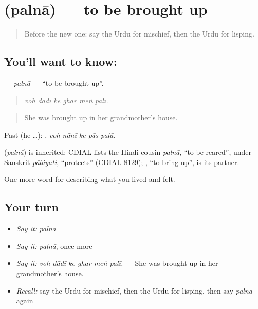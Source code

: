 \section[\texorpdfstring{\ur{پلنا} (palnā)}{پلنا (palnā)}]{ (palnā) — to be brought up}

\label{lesson:UR-C485-palna-reared}



\begin{quote}
Before the new one: say the Urdu for mischief, then the Urdu for lisping.
\end{quote}

\subsection*{You'll want to know: }
\textbf{} — \emph{palnā} — \textquotedblleft{}to be brought up\textquotedblright{}.

\begin{quote}
     
\end{quote}

\begin{quote}
\emph{voh dādī ke ghar meṅ palī.}
\end{quote}

\begin{quote}
She was brought up in her grandmother's house.
\end{quote}

Past (he …):     , \emph{voh nānī ke pās palā}.

\begin{cousinweb}
\textbf{} (\emph{palnā}) is inherited: CDIAL lists the Hindi cousin \emph{palnā}, \textquotedblleft{}to be reared\textquotedblright{}, under Sanskrit \emph{pāláyati}, \textquotedblleft{}protects\textquotedblright{} (CDIAL 8129); \textbf{}, \textquotedblleft{}to bring up\textquotedblright{}, is its partner.
\end{cousinweb}

\begin{grammarlens}[title={What you've built}]
One more word for describing what you lived and felt.
\end{grammarlens}

\subsection*{Your turn}
\begin{itemize}
\raggedright
  \item \emph{Say it:} \emph{palnā}
  \item \emph{Say it:} \emph{palnā}, once more
  \item \emph{Say it:} \emph{voh dādī ke ghar meṅ palī.} — She was brought up in her grandmother's house.
  \item \emph{Recall:} say the Urdu for mischief, then the Urdu for lisping, then say \emph{palnā} again
\end{itemize}

